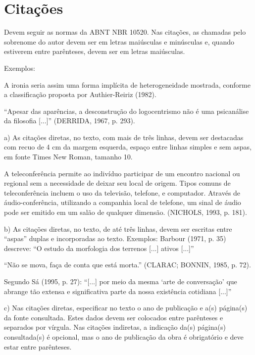 \documentclass[a4paper,11pt]{article}
\begin{document}
{\section*{Citações}
Devem seguir as normas da ABNT NBR 10520. Nas citações, as chamadas pelo sobrenome do autor devem ser em letras maiúsculas e minúsculas e, quando estiverem entre parênteses, devem ser em letras maiúsculas.

Exemplos:

A ironia seria assim uma forma implícita de heterogeneidade mostrada, conforme a classificação proposta por Authier-Reiriz (1982).

\vskip 0.2cm
``Apesar das aparências, a desconstrução do logocentrismo não é uma psicanálise da filosofia [...]'' (DERRIDA, 1967, p. 293).

\vskip 0.2cm
a) As citações diretas, no texto, com mais de três linhas, devem ser destacadas com recuo de 4 cm da margem esquerda, espaço entre linhas simples e sem aspas, em fonte Times New Roman, tamanho 10.

\begin{quoting}
A teleconferência permite ao indivíduo participar de um encontro nacional ou regional sem a necessidade de deixar seu local de origem. Tipos comuns de teleconferência incluem o uso da televisão, telefone, e computador. Através de áudio-conferência, utilizando a companhia local de telefone, um sinal de áudio pode ser emitido em um salão de qualquer dimensão. (NICHOLS, 1993, p. 181).
\end{quoting}

\vskip 0.2cm
b) As citações diretas, no texto, de até três linhas, devem ser escritas entre ``aspas'' duplas e incorporadas ao texto.
Exemplos:
Barbour (1971, p. 35) descreve: ``O estudo da morfologia dos terrenos [...] ativos [...]''

\vskip 0.2cm
``Não se mova, faça de conta que está morta.'' (CLARAC; BONNIN, 1985, p. 72).

\vskip 0.2cm
Segundo Sá (1995, p. 27): ``[...] por meio da mesma `arte de conversação' que abrange tão extensa e significativa parte da nossa existência cotidiana [...]''

\vskip 0.2cm
c) Nas citações diretas, especificar no texto o ano de publicação e a(s) página(s) da fonte consultada. Estes dados devem ser colocados entre parênteses e separados por vírgula. Nas citações indiretas, a indicação da(s) página(s) consultada(s) é opcional, mas o ano de publicação da obra é obrigatório e deve estar entre parênteses.


}
\end{document}
